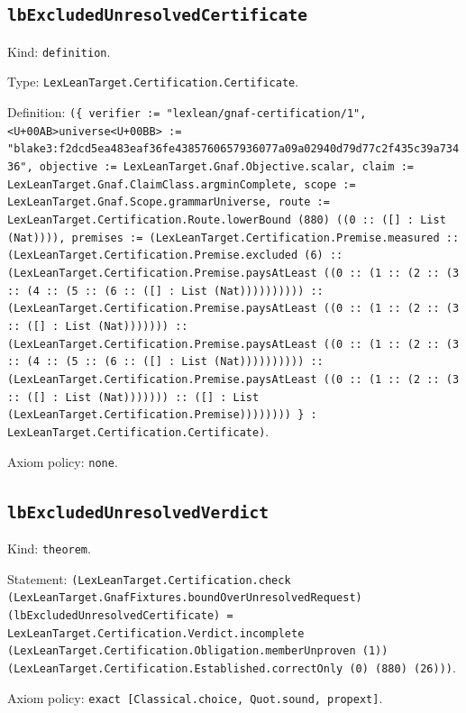 \documentclass[11pt]{article}
\begin{document}
\subsection*{\texttt{lbExcludedUnresolvedCertificate}}
\noindent Kind: \texttt{definition}.\par
\noindent Type: \texttt{LexLeanTarget.Certification.Certificate}.\par
\noindent Definition: \texttt{(\{ verifier := "lexlean/gnaf-certification/1", <U+00AB>universe<U+00BB> := "blake3:f2dcd5ea483eaf36fe4385760657936077a09a02940d79d77c2f435c39a73436", objective := LexLeanTarget.Gnaf.Objective.scalar, claim := LexLeanTarget.Gnaf.ClaimClass.argminComplete, scope := LexLeanTarget.Gnaf.Scope.grammarUniverse, route := LexLeanTarget.Certification.Route.lowerBound (880) ((0 :: ([] : List (Nat)))), premises := (LexLeanTarget.Certification.Premise.measured :: (LexLeanTarget.Certification.Premise.excluded (6) :: (LexLeanTarget.Certification.Premise.paysAtLeast ((0 :: (1 :: (2 :: (3 :: (4 :: (5 :: (6 :: ([] : List (Nat)))))))))) :: (LexLeanTarget.Certification.Premise.paysAtLeast ((0 :: (1 :: (2 :: (3 :: ([] : List (Nat))))))) :: (LexLeanTarget.Certification.Premise.paysAtLeast ((0 :: (1 :: (2 :: (3 :: (4 :: (5 :: (6 :: ([] : List (Nat)))))))))) :: (LexLeanTarget.Certification.Premise.paysAtLeast ((0 :: (1 :: (2 :: (3 :: ([] : List (Nat))))))) :: ([] : List (LexLeanTarget.Certification.Premise)))))))) \} : LexLeanTarget.Certification.Certificate)}.\par
\noindent Axiom policy: \texttt{none}.\par
\subsection*{\texttt{lbExcludedUnresolvedVerdict}}
\noindent Kind: \texttt{theorem}.\par
\noindent Statement: \texttt{(LexLeanTarget.Certification.check (LexLeanTarget.GnafFixtures.boundOverUnresolvedRequest) (lbExcludedUnresolvedCertificate) = LexLeanTarget.Certification.Verdict.incomplete (LexLeanTarget.Certification.Obligation.memberUnproven (1)) (LexLeanTarget.Certification.Established.correctOnly (0) (880) (26)))}.\par
\noindent Axiom policy: \texttt{exact [Classical.choice, Quot.sound, propext]}.\par
\end{document}
